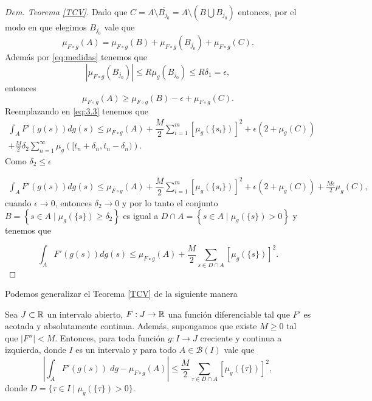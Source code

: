 \begin{proof}[Dem. Teorema \eqref{TCV}]
Dado que  $C=A\setminus\overline{B_{j_0}}=A\setminus(B\bigcup B_{j_0})$ entonces, por  el modo en que elegimos $B_{j_0}$ vale que  
$$\mu_{F\circ g}(A)=\mu_{F\circ g}(B)+\mu_{F\circ g}(B_{j_0})+\mu_{F\circ g}(C).$$
 Además por \eqref{eq:medidas} tenemos que
 $$\left| \mu_{F\circ g}(B_{j_0})\right| \leq R \mu_{g}(B_{j_0}) \leq R\delta_1=\epsilon,$$ 
entonces
$$\mu_{F\circ g}(A)\geq \mu_{F\circ g}(B)-\epsilon+\mu_{F\circ g}(C).$$
Reemplazando en \eqref{eq:3.3} tenemos que 
\begin{multline*}
	\int_{A}F'(g(s))dg(s) \leq \mu_{F\circ g}(A)+\dfrac{M}{2}\sum_{i=1}^{m} \left[ \mu_{g}(\{s_i\})\right] ^2+\epsilon\left(2+\mu_{g}(C)\right)  \\+\frac{M}{2}
	\delta_2\sum_{n=1}^{\infty} \mu_{g}\left( [t_n+\delta_n,t_n-\delta_n)\right). 
\end{multline*}
Como $\delta_2\leq\epsilon$


\begin{multline*}
	\int_{A}F'(g(s))dg(s) \leq \mu_{F\circ g}(A)+\dfrac{M}{2}\sum_{i=1}^{m} \left[ \mu_{g}(\{s_i\})\right] ^2+\epsilon(2+\mu_{g}\left(C\right))  +\frac{M\epsilon}{2}\mu_{g}\left( C\right), 
\end{multline*}
cuando $\epsilon \to 0$, entonces $\delta_2\to 0$ y por lo tanto el conjunto $B=\left\lbrace s\in A\mid \mu_{g}(\{s\})\geq \delta_2\right\rbrace $ es igual a $D\cap A=\left\lbrace s\in A\mid \mu_{g}(\{s\})> 0\right\rbrace$ y tenemos que

\begin{equation}
	\int_{A}F'(g(s))dg(s) \leq \mu_{F\circ g}(A)+\dfrac{M}{2}\sum_{s\in D\cap A} \left[ \mu_{g}(\{s\})\right] ^2. 
\end{equation}

\end{proof}
Podemos generalizar el Teorema \ref{TCV} de la siguiente manera
\begin{thm}
    Sea $J\subset \mathbb{R}$ un intervalo abierto, $F:J\to \mathbb{R}$ una función diferenciable tal que $F'$ es acotada y absolutamente continua. Además, supongamos que existe $M\geq0$ tal que $|F''|<M$. Entonces, para toda función $g:I\to J$ creciente y continua a izquierda, donde $I$ es un intervalo y para todo $A\in \mathcal{B}(I)$ vale que
    \begin{equation*}
        \left| \int_AF'(g(s)) \; dg  -\mu_{F\circ g}(A)\right|\leq \dfrac{M}{2}\sum_{\tau\in D\cap A}\left[\mu_g(\{\tau \})\right]^2,
    \end{equation*}
    donde $D=\{\tau\in I \mid \mu_g(\{\tau\})>0\}$.
\end{thm}
